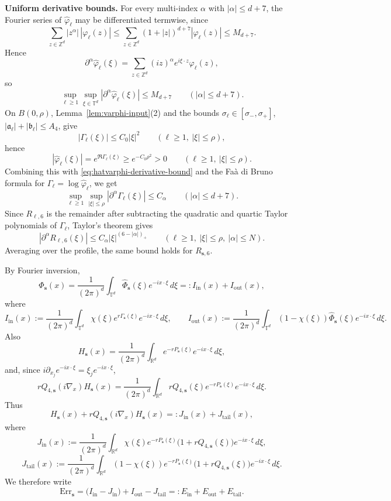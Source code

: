 \documentclass[letterpaper,11pt,reqno]{amsart}
\theoremstyle{definition}
\newcommand{\vs}{\mathbf{s}}\newcommand{\vt}{\mathbf{t}}\newcommand{\vu}{\mathbf{u}}
\begin{document}
\smallskip
\noindent\textbf{Uniform derivative bounds.}
For every multi-index \(\alpha\) with \(|\alpha|\le d+7\), the Fourier series of
\(\widehat\varphi_\ell\) may be differentiated termwise, since
\[
\sum_{z\in\mathbb Z^d}|z^\alpha|\,|\varphi_\ell(z)|
\le
\sum_{z\in\mathbb Z^d}(1+|z|)^{d+7}|\varphi_\ell(z)|
\le
M_{d+7}.
\]
Hence
\[
\partial^\alpha \widehat\varphi_\ell(\xi)
=
\sum_{z\in\mathbb Z^d}(iz)^\alpha e^{i\xi\cdot z}\varphi_\ell(z),
\]
so
\begin{equation}\label{eq:hatvarphi-derivative-bound}
\sup_{\ell\ge1}\sup_{\xi\in\mathbb T^d}
|\partial^\alpha \widehat\varphi_\ell(\xi)|
\le
M_{d+7}
\qquad (|\alpha|\le d+7).
\end{equation}
On \(B(0,\rho)\), Lemma~\ref{lem:varphi-input}(2) and the bounds
\(\sigma_\ell\in[\sigma_-,\sigma_+]\), \(|\mathfrak a_\ell|+|\mathfrak b_\ell|\le A_4\),
give
\[
|\Gamma_\ell(\xi)|\le C_0|\xi|^2
\qquad (\ell\ge1,\ |\xi|\le\rho),
\]
hence
\[
|\widehat\varphi_\ell(\xi)|=e^{\Re\Gamma_\ell(\xi)}\ge e^{-C_0\rho^2}>0
\qquad (\ell\ge1,\ |\xi|\le\rho).
\]
Combining this with \eqref{eq:hatvarphi-derivative-bound} and the Fa\`a di Bruno formula for
\(\Gamma_\ell=\log \widehat\varphi_\ell\), we get
\begin{equation*}
\sup_{\ell\ge1}\sup_{|\xi|\le\rho}
|\partial^\alpha \Gamma_\ell(\xi)|
\le
C_\alpha
\qquad (|\alpha|\le d+7).
\end{equation*}
Since \(R_{\ell,6}\) is the remainder after subtracting the quadratic and quartic Taylor
polynomials of \(\Gamma_\ell\), Taylor's theorem gives
\begin{equation}\label{eq:R6-derivative-bound}
|\partial^\alpha R_{\ell,6}(\xi)|
\le
C_\alpha |\xi|^{(6-|\alpha|)_+}
\qquad (\ell\ge1,\ |\xi|\le\rho,\ |\alpha|\le N).
\end{equation}
Averaging over the profile, the same bound holds for \(R_{\vs,6}\).

\smallskip

By Fourier inversion,
\[
\Phi_{\vs}(x)
=
\frac1{(2\pi)^d}\int_{\mathbb T^d}\widehat\Phi_{\vs}(\xi)e^{-ix\cdot\xi}\,d\xi
=:I_{\mathrm{in}}(x)+I_{\mathrm{out}}(x),
\]
where
\[
I_{\mathrm{in}}(x):=
\frac1{(2\pi)^d}\int_{\mathbb T^d}\chi(\xi)e^{r\Gamma_{\vs}(\xi)}e^{-ix\cdot\xi}\,d\xi,
\qquad
I_{\mathrm{out}}(x):=
\frac1{(2\pi)^d}\int_{\mathbb T^d}(1-\chi(\xi))\widehat\Phi_{\vs}(\xi)e^{-ix\cdot\xi}\,d\xi.
\]
Also
\[
H_{\vs}(x)
=
\frac1{(2\pi)^d}\int_{\mathbb R^d}e^{-rP_{\vs}(\xi)}e^{-ix\cdot\xi}\,d\xi,
\]
and, since $i\partial_{x_j}e^{-ix\cdot\xi}=\xi_j e^{-ix\cdot\xi}$,
\[
rQ_{4,\vs}(i\nabla_x)H_{\vs}(x)
=
\frac1{(2\pi)^d}\int_{\mathbb R^d}rQ_{4,\vs}(\xi)e^{-rP_{\vs}(\xi)}e^{-ix\cdot\xi}\,d\xi.
\]
Thus
\[
H_{\vs}(x)+rQ_{4,\vs}(i\nabla_x)H_{\vs}(x)
=:J_{\mathrm{in}}(x)+J_{\mathrm{tail}}(x),
\]
where
\[
J_{\mathrm{in}}(x):=
\frac1{(2\pi)^d}\int_{\mathbb R^d}
\chi(\xi)e^{-rP_{\vs}(\xi)}\bigl(1+rQ_{4,\vs}(\xi)\bigr)e^{-ix\cdot\xi}\,d\xi,
\]
\[
J_{\mathrm{tail}}(x):=
\frac1{(2\pi)^d}\int_{\mathbb R^d}
(1-\chi(\xi))e^{-rP_{\vs}(\xi)}\bigl(1+rQ_{4,\vs}(\xi)\bigr)e^{-ix\cdot\xi}\,d\xi.
\]
We therefore write
\[
\mathrm{Err}_{\vs}
=
\bigl(I_{\mathrm{in}}-J_{\mathrm{in}}\bigr)
+I_{\mathrm{out}}
-J_{\mathrm{tail}}
=:E_{\mathrm{in}}+E_{\mathrm{out}}+E_{\mathrm{tail}}.
\]
\end{document}
